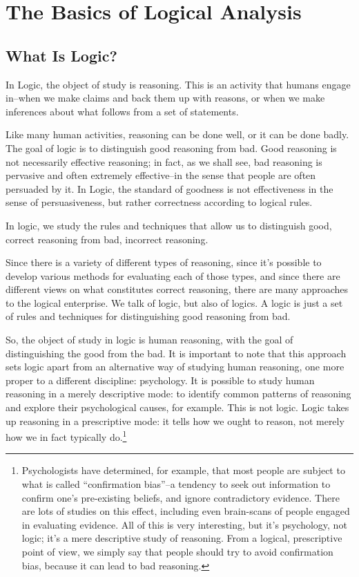 \section{The Basics of Logical Analysis}

\subsection{What Is Logic?}
In Logic, the object of study is reasoning. This is an activity that humans engage in--when we
make claims and back them up with reasons, or when we make inferences about what follows from
a set of statements.

Like many human activities, reasoning can be done well, or it can be done badly. The goal of logic
is to distinguish good reasoning from bad. Good reasoning is not necessarily effective reasoning;
in fact, as we shall see, bad reasoning is pervasive and often extremely effective--in the sense that
people are often persuaded by it. In Logic, the standard of goodness is not effectiveness in the
sense of persuasiveness, but rather correctness according to logical rules.

In logic, we study the rules and techniques that allow us to distinguish good, correct reasoning
from bad, incorrect reasoning.

Since there is a variety of different types of reasoning, since it's possible to develop various
methods for evaluating each of those types, and since there are different views on what constitutes
correct reasoning, there are many approaches to the logical enterprise. We talk of logic, but also
of logics. A logic is just a set of rules and techniques for distinguishing good reasoning from bad.

So, the object of study in logic is human reasoning, with the goal of distinguishing the good from 
the bad. It is important to note that this approach sets logic apart from an alternative way of 
studying human reasoning, one more proper to a different discipline: psychology. It is possible to 
study human reasoning in a merely descriptive mode: to identify common patterns of reasoning and 
explore their psychological causes, for example. This is not logic. Logic takes up reasoning in a 
prescriptive mode: it tells how we ought to reason, not merely how we in fact typically 
do.\footnote{Psychologists have determined, for example, that most people are subject to what is 
called ``confirmation bias''--a tendency to seek out information to confirm one's pre-existing beliefs, 
and ignore contradictory evidence. There are lots of studies on this effect, including even 
brain-scans of people engaged in evaluating evidence. All of this is very interesting, but it's 
psychology, not logic; it's a mere descriptive study of reasoning. From a logical, prescriptive point 
of view, we simply say that people should try to avoid confirmation bias, because it can lead to bad 
reasoning.}

